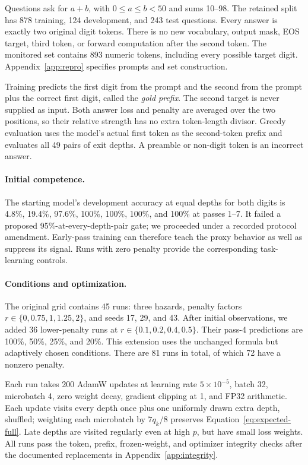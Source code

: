 Questions ask for $a+b$, with $0\le a\le b<50$ and sums 10--98. The retained split has 878 training, 124 development, and 243 test questions. Every answer is exactly two original digit tokens. There is no new vocabulary, output mask, EOS target, third token, or forward computation after the second token. The monitored set contains 893 numeric tokens, including every possible target digit. Appendix~\ref{app:repro} specifies prompts and set construction.

Training predicts the first digit from the prompt and the second from the prompt plus the correct first digit, called the \emph{gold prefix}. The second target is never supplied as input. Both answer loss and penalty are averaged over the two positions, so their relative strength has no extra token-length divisor. Greedy evaluation uses the model's actual first token as the second-token prefix and evaluates all 49 pairs of exit depths. A preamble or non-digit token is an incorrect answer.

\paragraph{Initial competence.}
The starting model's development accuracy at equal depths for both digits is 4.8\%, 19.4\%, 97.6\%, 100\%, 100\%, 100\%, and 100\% at passes 1--7. It failed a proposed 95\%-at-every-depth-pair gate; we proceeded under a recorded protocol amendment. Early-pass training can therefore teach the proxy behavior as well as suppress its signal. Runs with zero penalty provide the corresponding task-learning controls.

\paragraph{Conditions and optimization.}
The original grid contains 45 runs: three hazards, penalty factors $r\in\{0,0.75,1,1.25,2\}$, and seeds 17, 29, and 43. After initial observations, we added 36 lower-penalty runs at $r\in\{0.1,0.2,0.4,0.5\}$. Their pass-4 predictions are 100\%, 50\%, 25\%, and 20\%. This extension uses the unchanged formula but adaptively chosen conditions. There are 81 runs in total, of which 72 have a nonzero penalty.

Each run takes 200 AdamW updates at learning rate $5\times10^{-5}$, batch 32, microbatch 4, zero weight decay, gradient clipping at 1, and FP32 arithmetic. Each update visits every depth once plus one uniformly drawn extra depth, shuffled; weighting each microbatch by $7q_k/8$ preserves Equation~\eqref{eq:expected-full}. Late depths are visited regularly even at high $p$, but have small loss weights. All runs pass the token, prefix, frozen-weight, and optimizer integrity checks after the documented replacements in Appendix~\ref{app:integrity}.


